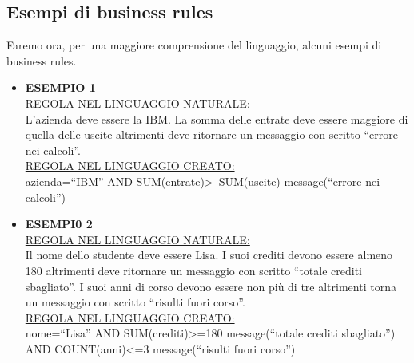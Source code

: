 \subsection{Esempi di business rules}
Faremo ora, per una maggiore comprensione del linguaggio, alcuni esempi di business rules.
\begin{itemize}
\item \textbf{ESEMPIO 1} \\
\underline{REGOLA NEL LINGUAGGIO NATURALE:} \\
L'azienda deve essere la IBM. La somma delle entrate deve essere maggiore di quella delle uscite altrimenti deve ritornare un messaggio con scritto ``errore nei calcoli''. \\
\underline{REGOLA NEL LINGUAGGIO CREATO:} \\
azienda=``IBM'' AND SUM(entrate)\textgreater\ SUM(uscite) message(``errore nei calcoli'')
\item \textbf{ESEMPI0 2} \\
\underline{REGOLA NEL LINGUAGGIO NATURALE:} \\
Il nome dello studente deve essere Lisa. I suoi crediti devono essere almeno 180 altrimenti deve ritornare un messaggio con scritto ``totale crediti sbagliato''. I suoi anni di corso devono essere non pi\`u di tre altrimenti torna un messaggio con scritto ``risulti fuori corso''.  \\
\underline{REGOLA NEL LINGUAGGIO CREATO:} \\
nome=``Lisa'' AND SUM(crediti)\textgreater =180 message(``totale crediti sbagliato'') AND COUNT(anni)\textless =3 message(``risulti fuori corso'')
\end{itemize}

